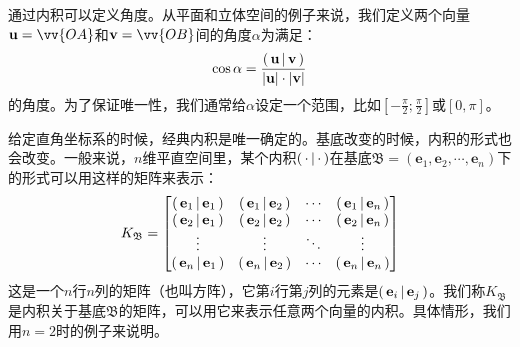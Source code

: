 \documentclass[12pt,UTF8]{ctexbook}
\begin{document}
通过内积可以定义角度。从平面和立体空间的例子来说，我们定义两个向量$\mathbf{u} = \vv{OA}$和$\mathbf{v} = \vv{OB}$间的角度$\alpha$为满足：
$$ \cos{\alpha } = \frac{\displaystyle\left( \,\mathbf{u} \,\middle\vert \,\mathbf{v} \,\right)}{|\mathbf{u}|\cdot|\mathbf{v}|}$$
的角度。为了保证唯一性，我们通常给$\alpha$设定一个范围，比如$\left[-\frac{\pi}{2};\frac{\pi}{2}\right]$或$[0,\pi]$。

给定直角坐标系的时候，经典内积是唯一确定的。基底改变的时候，内积的形式也会改变。一般来说，$n$维平直空间里，某个内积$\displaystyle\left( \,\cdot \,\middle\vert \,\cdot \,\right)$在基底$\mathfrak{B} = (\mathbf{e}_1, \mathbf{e}_2, \cdots, \mathbf{e}_n)$下的形式可以用这样的矩阵来表示：
$$ K_{\mathfrak{B}} = \begin{bmatrix}
    \displaystyle\left( \,\mathbf{e}_1 \,\middle\vert \,\mathbf{e}_1 \,\right) & \displaystyle\left( \,\mathbf{e}_1 \,\middle\vert \,\mathbf{e}_2 \,\right) & \cdots & \displaystyle\left( \,\mathbf{e}_1 \,\middle\vert \,\mathbf{e}_n \,\right) \\ \displaystyle\left( \,\mathbf{e}_2 \,\middle\vert \,\mathbf{e}_1 \,\right) & \displaystyle\left( \,\mathbf{e}_2 \,\middle\vert \,\mathbf{e}_2 \,\right) & \cdots & \displaystyle\left( \,\mathbf{e}_2 \,\middle\vert \,\mathbf{e}_n \,\right) \\ \vdots & \vdots & \ddots & \vdots \\ \displaystyle\left( \,\mathbf{e}_n \,\middle\vert \,\mathbf{e}_1 \,\right) & \displaystyle\left( \,\mathbf{e}_n \,\middle\vert \,\mathbf{e}_2 \,\right) & \cdots & \displaystyle\left( \,\mathbf{e}_n \,\middle\vert \,\mathbf{e}_n \,\right) 
\end{bmatrix} $$
这是一个$n$行$n$列的矩阵（也叫方阵），它第$i$行第$j$列的元素是$\displaystyle\left( \,\mathbf{e}_i \,\middle\vert \,\mathbf{e}_j \,\right)$。我们称$K_{\mathfrak{B}}$是内积关于基底$\mathfrak{B}$的矩阵，可以用它来表示任意两个向量的内积。具体情形，我们用$n=2$时的例子来说明。
\end{document}
